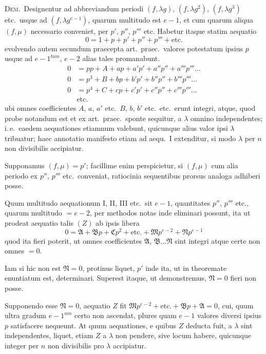 \documentclass[12pt,a4paper]{article}
\theoremstyle{plain}
\theoremstyle{definition}
\theoremstyle{remark}
\begin{document}
\textsc{Dem.}\ Designentur ad abbreviandum periodi $(f,\lambda g)$, $(f,\lambda g^2)$, $(f,\lambda g^3)$ etc.\ usque ad $(f,\lambda g^{e-1})$, quarum multitudo est $e-1$, et cum quarum aliqua $(f,\mu)$ necessario conveniet, per $p'$, $p''$, $p'''$ etc. Habetur itaque statim aequatio
\[0=1+p+p'+p''+p'''+\text{etc.}\tag{I}\]
evolvendo autem secundum praecepta art.\ praec.\ valores potestatum ipsius $p$ usque ad $e-1^{tam}$, $e-2$ alias tales promanabunt.
\begin{align*}
0&=pp+A+ap+a'p'+a''p''+a'''p'''\ldots\tag{II}\\
0&=p^3+B+bp+b'p'+b''p''+b'''p'''\ldots\tag{III}\\
0&=p^4+C+cp+c'p'+c''p''+c'''p'''\ldots\tag{IV}\\
&\text{etc.}
\end{align*}
ubi omnes coefficientes $A$, $a$, $a'$ etc.\ $B$, $b$, $b'$ etc.\ etc.\ erunt integri, atque, quod probe notandum est et ex art.\ praec.\ sponte sequitur, a $\lambda$ omnino independentes; i.\,e.\ eaedem aequationes etiamnum valebunt, quicunque alius valor ipsi $\lambda$ tribuatur; haec annotatio manifesto etiam ad aequ.\ I extenditur, si modo $\lambda$ per $n$ non divisibilis accipiatur.

Supponamus $(f,\mu)=p'$; facillime enim perspicietur, si $(f,\mu)$ cum alia periodo ex $p''$, $p'''$ etc.\ conveniat, ratiocinia sequentibus prorsus analoga adhiberi posse.

Quum multitudo aequationum I, II, III etc.\ sit $e-1$, quantitates $p''$, $p'''$ etc., quarum multitudo $=e-2$, per methodos notas inde eliminari possunt, ita ut prodeat aequatio talis $(Z)$ ab ipsis libera
\[0=\mathfrak{A}+\mathfrak{B}p+\mathfrak{C}p^2+\text{etc.}+\mathfrak{M}p^{e-2}+\mathfrak{N}p^{e-1}\]
quod ita fieri poterit, ut omnes coefficientes $\mathfrak{A}$, $\mathfrak{B}\ldots\mathfrak{N}$ sint integri atque certe non omnes $=0$.

Iam si hic non est $\mathfrak{N}=0$, protinus liquet, $p'$ inde ita, ut in theoremate enuntiatum est, determinari. Superest itaque, ut demonstremus, $\mathfrak{N}=0$ fieri non posse.

Supponendo esse $\mathfrak{N}=0$, aequatio $Z$ fit $\mathfrak{M}p^{e-2}+\text{etc.}+\mathfrak{B}p+\mathfrak{A}=0$, cui, quum ultra gradum $e-1^{um}$ certo non ascendat, plures quam $e-1$ valores diversi ipsius $p$ satisfacere nequeunt. At quum aequationes, e quibus $Z$ deducta fuit, a $\lambda$ sint independentes, liquet, etiam $Z$ a $\lambda$ non pendere, sive locum habere, quicunque integer per $n$ non divisibilis pro $\lambda$ accipiatur.
\end{document}
